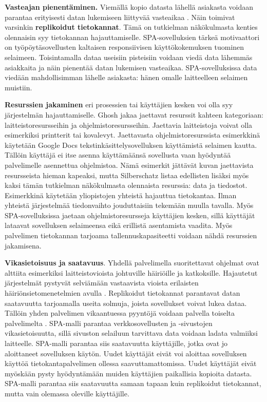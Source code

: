 \documentclass[finnish,twoside,censored,csm,sw-track-2018]{HYthesisML}
\begin{document}
\textbf{Vasteajan pienentäminen.} Viemällä kopio datasta lähellä asiakasta voidaan parantaa erityisesti datan lukemiseen liittyvää vasteaikaa \citep{rfc677, Kleppmann}. Näin toimivat varsinkin \textbf{replikoidut tietokannat}. Tämä on tutkielman näkökulmasta kenties olennaisin syy tietokannan hajauttamiselle. SPA-sovelluksien tärkeä motivaattori on työpöytäsovellusten kaltaisen responsiivisen käyttökokemuksen tuominen selaimeen. Toisintamalla dataa useisiin pisteisiin voidaan viedä data lähemmäs asiakkaita ja näin pienentää datan lukemisen vasteaikaa. SPA-sovelluksissa data viedään mahdollisimman lähelle asiakasta: hänen omalle laitteelleen selaimen muistiin.

\textbf{Resurssien jakaminen} eri prosessien tai käyttäjien kesken voi olla syy järjestelmän hajauttamiselle. Ghosh \citep{DSAA} jakaa jaettavat resurssit kahteen kategoriaan: laitteistoresursseihin ja ohjelmistoresursseihin. Jaettavia laitteistoja voivat olla esimerkiksi printterit tai kovalevyt. Jaettavasta ohjelmistoresurssista esimerkkinä käyte\-tään Google Docs tekstinkäsittelysovelluksen käyttämistä selaimen kautta. Tällöin käyttäjä ei itse asenna käyttä\-määnsä sovellusta vaan hyödyntää palvelimelle asennettua ohjelmistoa. Nämä esimerkit jättävät kuvan jaettavista resursseista hieman kapeaksi, mutta Silberschatz \citep{DSC} listaa edellisten lisäksi myös kaksi tämän tutkielman näkökulmasta olennaista resurssia: data ja tiedostot. Esimerkkinä käytetään yliopistojen yhteistä hajauttua tietokantaa. Ilman yhteistä järjestelmää tiedonvaihto jouduttaisiin tekemään muulla tavalla. Myös SPA-sovelluksissa jaetaan ohjelmistoresursseja käyttäjien kesken, sillä käyttäjät lataavat sovelluksen selaimeensa eikä erillistä asentamista vaadita. Myös palvelimen tietokannan tarjoama tallennuskapasiteetti voidaan nähdä resurssien jakamisena.

\textbf{Vikasietoisuus ja saatavuus}. Yhdellä palvelimella suoritettavat ohjelmat ovat alttiita esimerkiksi laitteistovioista johtuville häiriöille ja katkoksille. Hajautetut järjestelmät pystyvät selviämään vastaavista vioista erilaisten häiriönsietomenetelmien avulla \citep{DSAA, DSC, Tanenbaum, rfc677}. Replikoidut tietokannat parantavat datan saatavuutta tarjoamalla useita solmuja, joista sovellukset voivat lukea dataa. Tällöin yhden palvelimen vikaantuessa pyyntöjä voidaan palvella toiselta palvelimelta \cite{DSAA}. SPA-malli parantaa verkkosovellusten ja -sivustojen vikasietoisuutta, sillä sivuston selailuun tarvittava data voidaan ladata valmiiksi laitteelle. SPA-malli parantaa siis saatavuutta käyttäjille, jotka ovat jo aloittaneet sovelluksen käytön. Uudet käyttäjät eivät voi aloittaa sovelluksen käyttöä tietokantapalvelimen ollessa saavuttamattomissa. Uudet käyttäjät eivät myöskään pysty hyödyntämään muiden käyttäjien paikallisia kopioita datasta. SPA-malli parantaa siis saatavuutta samaan tapaan kuin replikoidut tietokannat, mutta vain olemassa oleville käyttäjille. 
\end{document}
